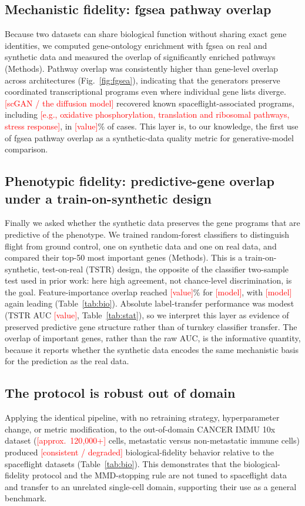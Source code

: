 \documentclass[11pt]{article}
\newcommand{\protname}{biological-fidelity protocol}
\newcommand{\res}[1]{\textcolor{red}{[#1]}}
\begin{document}
\subsection{Mechanistic fidelity: fgsea pathway overlap}
Because two datasets can share biological function without sharing exact gene identities, we computed gene-ontology enrichment with fgsea on real and synthetic data and measured the overlap of significantly enriched pathways (Methods). Pathway overlap was consistently higher than gene-level overlap across architectures (Fig.~\ref{fig:fgsea}), indicating that the generators preserve coordinated transcriptional programs even where individual gene lists diverge. \res{scGAN / the diffusion model} recovered known spaceflight-associated programs, including \res{e.g., oxidative phosphorylation, translation and ribosomal pathways, stress response}, in \res{value}\% of cases. This layer is, to our knowledge, the first use of fgsea pathway overlap as a synthetic-data quality metric for generative-model comparison.

\subsection{Phenotypic fidelity: predictive-gene overlap under a train-on-synthetic design}
Finally we asked whether the synthetic data preserves the gene programs that are predictive of the phenotype. We trained random-forest classifiers to distinguish flight from ground control, one on synthetic data and one on real data, and compared their top-50 most important genes (Methods). This is a train-on-synthetic, test-on-real (TSTR) design, the opposite of the classifier two-sample test used in prior work: here high agreement, not chance-level discrimination, is the goal. Feature-importance overlap reached \res{value}\% for \res{model}, with \res{model} again leading (Table~\ref{tab:bio}). Absolute label-transfer performance was modest (TSTR AUC \res{value}, Table~\ref{tab:stat}), so we interpret this layer as evidence of preserved predictive gene structure rather than of turnkey classifier transfer. The overlap of important genes, rather than the raw AUC, is the informative quantity, because it reports whether the synthetic data encodes the same mechanistic basis for the prediction as the real data.

\subsection{The protocol is robust out of domain}
Applying the identical pipeline, with no retraining strategy, hyperparameter change, or metric modification, to the out-of-domain CANCER IMMU 10x dataset (\res{approx.\ 120{,}000+} cells, metastatic versus non-metastatic immune cells) produced \res{consistent / degraded} biological-fidelity behavior relative to the spaceflight datasets (Table~\ref{tab:bio}). This demonstrates that the \protname{} and the MMD-stopping rule are not tuned to spaceflight data and transfer to an unrelated single-cell domain, supporting their use as a general benchmark.
\end{document}
